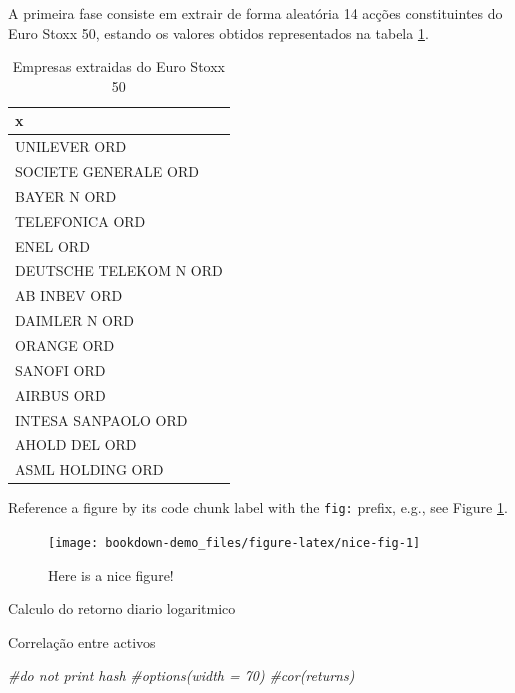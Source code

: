 \documentclass[
  12pt,
  a4paper,
  openany]{book}
\newenvironment{Shaded}{\begin{snugshade}}{\end{snugshade}}
\newcommand{\CommentTok}[1]{\textcolor[rgb]{0.56,0.35,0.01}{\textit{#1}}}
\begin{document}
A primeira fase consiste em extrair de forma aleatória 14 acções constituintes do Euro Stoxx 50, estando os valores obtidos representados na tabela \ref{tab:nice-tab}.
\scriptsize

\begin{table}[!h]

\caption{\label{tab:nice-tab}Empresas extraidas do Euro Stoxx 50}
\centering
\begin{tabular}[t]{l}
\toprule
x\\
\midrule
UNILEVER ORD\\
SOCIETE GENERALE ORD\\
BAYER N ORD\\
TELEFONICA ORD\\
ENEL ORD\\
\addlinespace
DEUTSCHE TELEKOM N ORD\\
AB INBEV ORD\\
DAIMLER N ORD\\
ORANGE ORD\\
SANOFI ORD\\
\addlinespace
AIRBUS ORD\\
INTESA SANPAOLO ORD\\
AHOLD DEL ORD\\
ASML HOLDING ORD\\
\bottomrule
\end{tabular}
\end{table}

\normalsize

Reference a figure by its code chunk label with the \texttt{fig:} prefix, e.g., see Figure \ref{fig:nice-fig}.
\scriptsize

\begin{figure}

{\centering \texttt{[image: bookdown-demo\_files/figure-latex/nice-fig-1]} 

}

\caption{Here is a nice figure!}\label{fig:nice-fig}
\end{figure}

Calculo do retorno diario logaritmico
\scriptsize

\normalsize

Correlação entre activos
\scriptsize

\begin{Shaded}
\begin{Highlighting}[]
\CommentTok{\#do not print hash}
\CommentTok{\#options(width = 70)}
\CommentTok{\#cor(returns)}
\end{Highlighting}
\end{Shaded}
\end{document}
